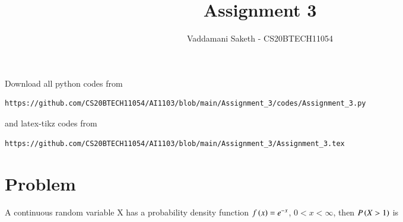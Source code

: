 \documentclass[journal,12pt,twocolumn]{IEEEtran}
\begin{document}
     \def\rightbox#1{\makebox[0in][r]{#1}}
     \def\centbox#1{\makebox[0in]{#1}}
     \def\topbox#1{\raisebox{-\baselineskip}[0in][0in]{#1}}
     \def\midbox#1{\raisebox{-0.5\baselineskip}[0in][0in]{#1}}
\vspace{3cm}
\title{Assignment 3}
\author{Vaddamani Saketh - CS20BTECH11054}
\maketitle
\newpage
\bigskip
\renewcommand{\thefigure}{\theenumi}
\renewcommand{\thetable}{\theenumi}
Download all python codes from 
\begin{lstlisting}
https://github.com/CS20BTECH11054/AI1103/blob/main/Assignment_3/codes/Assignment_3.py
\end{lstlisting}
%
and latex-tikz codes from 
%
\begin{lstlisting}
https://github.com/CS20BTECH11054/AI1103/blob/main/Assignment_3/Assignment_3.tex
\end{lstlisting}
\section{Problem}
A continuous random variable X has a probability density function $f\left(x\right)=e^{-x}$, $0<x<\infty$, then  $P\left(X>1\right)$ is
\end{document}

